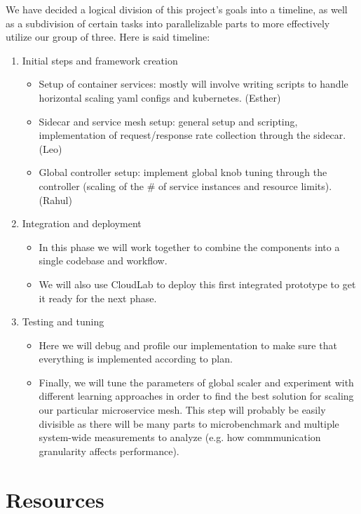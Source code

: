 \documentclass{proposal}
\begin{document}
We have decided a logical division of this project's goals into a timeline, as well as a subdivision of certain tasks into parallelizable parts to more effectively utilize our group of three. Here is said timeline:
\begin{enumerate}
    \item Initial steps and framework creation
    \begin{itemize}
        \item Setup of container services: mostly will involve writing scripts to handle horizontal scaling yaml configs and kubernetes. (Esther)
        \item Sidecar and service mesh setup: general setup and scripting, implementation of request/response rate collection through the sidecar. (Leo)
        \item Global controller setup: implement global knob tuning through the controller (scaling of the \# of service instances and resource limits). (Rahul)
    \end{itemize}
    \item Integration and deployment
    \begin{itemize}
        \item In this phase we will work together to combine the components into a single codebase and workflow.
        \item We will also use CloudLab to deploy this first integrated prototype to get it ready for the next phase.
    \end{itemize}
    \item Testing and tuning
    \begin{itemize}
        \item Here we will debug and profile our implementation to make sure that everything is implemented according to plan.
        \item Finally, we will tune the parameters of global scaler and experiment with different learning approaches in order to find the best solution for scaling our particular microservice mesh. This step will probably be easily divisible as there will be many parts to microbenchmark and multiple system-wide measurements to analyze (e.g. how commmunication granularity affects performance).
    \end{itemize}
\end{enumerate}
\section{Resources}
\end{document}
